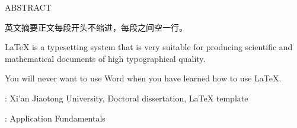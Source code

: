 \noindent\parbox[c][15mm][c]{\textwidth}{\centering\sanhao ABSTRACT}

\noindent 英文摘要正文每段开头不缩进，每段之间空一行。\newline

\noindent \LaTeX{} is a typesetting system that is very suitable for producing scientific and mathematical documents of high typographical quality. \newline

\noindent You will never want to use Word when you have learned how to use \LaTeX.

\vspace{\baselineskip}
{ \hangindent=69.6pt
	: Xi'an Jiaotong University, Doctoral dissertation, \LaTeX{} template
	
	\vspace{\baselineskip}
	: Application Fundamentals
}

\clearpage
